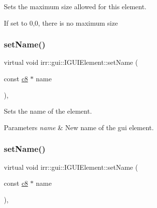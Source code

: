 Sets the maximum size allowed for this element. 

If set to 0,0, there is no maximum size \mbox{\label{classirr_1_1gui_1_1IGUIElement_a47ce14d1a973137b6cbe91a047df2ebe}} 
\subsubsection{\texorpdfstring{set\+Name()}{setName()}\hspace{0.1cm}{\footnotesize\ttfamily [1/4]}}
{\footnotesize\ttfamily virtual void irr\+::gui\+::\+I\+G\+U\+I\+Element\+::set\+Name (\begin{DoxyParamCaption}\item[{const \hyperlink{namespaceirr_a9395eaea339bcb546b319e9c96bf7410}{c8} $\ast$}]{name }\end{DoxyParamCaption})\hspace{0.3cm}{\ttfamily [inline]}, {\ttfamily [virtual]}}



Sets the name of the element. 


\begin{DoxyParams}{Parameters}
{\em name} & New name of the gui element. \\
\hline
\end{DoxyParams}
\mbox{\label{classirr_1_1gui_1_1IGUIElement_a47ce14d1a973137b6cbe91a047df2ebe}} 
\subsubsection{\texorpdfstring{set\+Name()}{setName()}\hspace{0.1cm}{\footnotesize\ttfamily [2/4]}}
{\footnotesize\ttfamily virtual void irr\+::gui\+::\+I\+G\+U\+I\+Element\+::set\+Name (\begin{DoxyParamCaption}\item[{const \hyperlink{namespaceirr_a9395eaea339bcb546b319e9c96bf7410}{c8} $\ast$}]{name }\end{DoxyParamCaption})\hspace{0.3cm}{\ttfamily [inline]}, {\ttfamily [virtual]}}



